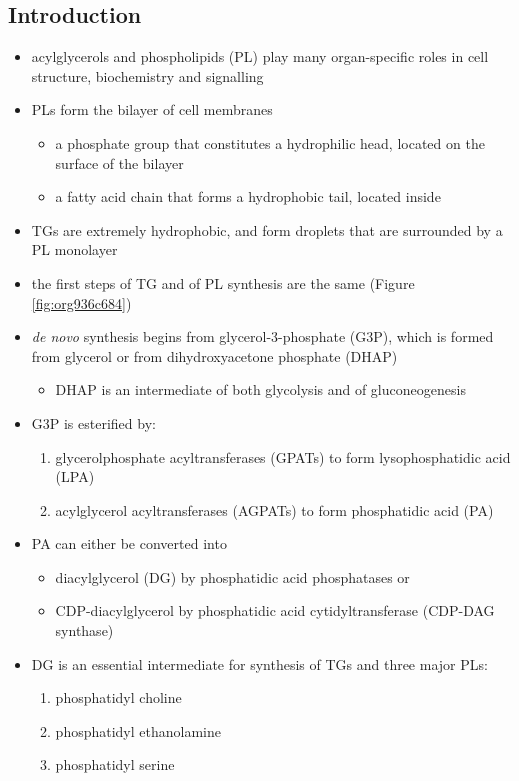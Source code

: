 \documentclass{scrartcl}
\begin{document}
\subsection{Introduction}
\label{sec:org2fc6cb0}
\begin{itemize}
\item acylglycerols and phospholipids (PL) play many organ-specific roles
in cell structure, biochemistry and signalling
\item PLs form the bilayer of cell membranes
\begin{itemize}
\item a phosphate group that constitutes a hydrophilic head, located on the surface of the bilayer
\item a fatty acid chain that forms a hydrophobic tail, located inside
\end{itemize}
\item TGs are extremely hydrophobic, and form droplets
that are surrounded by a PL monolayer
\item the first steps of TG and of PL synthesis are the same (Figure \ref{fig:org936c684})
\item \emph{de novo} synthesis begins from glycerol-3-phosphate (G3P), which is
formed from glycerol or from dihydroxyacetone phosphate (DHAP)
\begin{itemize}
\item DHAP is an intermediate of both glycolysis and of gluconeogenesis
\end{itemize}
\item G3P is esterified by:
\begin{enumerate}
\item glycerolphosphate acyltransferases (GPATs) to form lysophosphatidic acid (LPA)
\item acylglycerol acyltransferases (AGPATs) to form phosphatidic acid (PA)
\end{enumerate}
\item PA can either be converted into
\begin{itemize}
\item diacylglycerol (DG) by phosphatidic acid phosphatases or
\item CDP-diacylglycerol by phosphatidic acid cytidyltransferase (CDP-DAG synthase)
\end{itemize}
\item DG is an essential intermediate for synthesis of TGs and three major PLs:
\begin{enumerate}
\item phosphatidyl choline
\item phosphatidyl ethanolamine
\item phosphatidyl serine
\end{enumerate}
\end{itemize}
\end{document}
